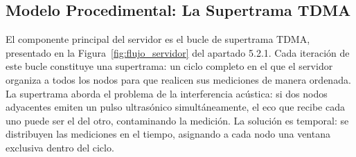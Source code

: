 \begin{table}[H]
\centering
{}
\vspace{6pt}
\caption{Mapa de bytes de \texttt{MSG\_DATA\_REPORT}.}
\label{tab:data_report}
\end{table}


\subsection{Modelo Procedimental: La Supertrama TDMA}

El componente principal del servidor es el bucle de supertrama TDMA, presentado en la Figura~\ref{fig:flujo_servidor} del apartado 5.2.1. Cada iteración de este bucle constituye una supertrama: un ciclo completo en el que el servidor organiza a todos los nodos para que realicen sus mediciones de manera ordenada. La supertrama aborda el problema de la interferencia acústica: si dos nodos adyacentes emiten un pulso ultrasónico simultáneamente, el eco que recibe cada uno puede ser el del otro, contaminando la medición. La solución es temporal: se distribuyen las mediciones en el tiempo, asignando a cada nodo una ventana exclusiva dentro del ciclo.


